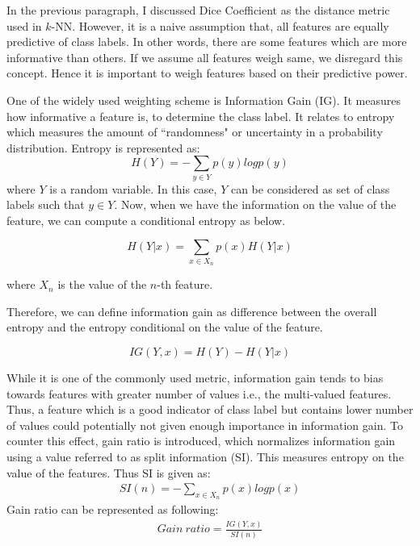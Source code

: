 In the previous paragraph, I discussed Dice Coefficient as the distance metric used in $k$-NN. However, it is a naive assumption that, all features are equally predictive of class labels. In other words, there are some features which are more informative than others. If we assume all features weigh same, we disregard this concept. Hence it is important to weigh features based on their predictive power. 

One of the widely used weighting scheme is Information Gain (IG). It measures how informative a feature is, to determine the class label. It relates to entropy which measures the amount of ``randomness" or uncertainty in a probability distribution. Entropy is represented as:
\begin{equation}
   H(Y) = -\sum_{y \in Y}  p(y)logp(y) 
\end{equation}
where $Y$ is a random variable. In this case, $Y$ can be considered as set of class labels such that $y \in Y$. 
Now, when we have the information on the value of the feature, we can compute a conditional entropy as below. 

\begin{equation}
    H(Y|x) = \sum_{x \in X_n} p(x)H(Y|x)
\end{equation}

where $X_n$ is the value of the $n$-th feature.


Therefore, we can define information gain as difference between the overall entropy and the entropy conditional on the value of the feature. 

\begin{equation}
    IG(Y,x) = H(Y) - H(Y|x)
\end{equation}

While it is one of the commonly used metric, information gain tends to bias towards features with greater number of values i.e., the multi-valued features. Thus, a feature which is a good indicator of class label but contains lower number of values could potentially not given enough importance in information gain. To counter this effect, gain ratio is introduced, which normalizes information gain using a value referred to as split information (SI). This measures entropy on the value of the features. Thus SI is given as:
\begin{align}
    SI(n) = - \sum_{x \in X_n} p(x)logp(x)
\end{align}
Gain ratio can be represented as following:
\begin{align}
    Gain\ ratio = \frac{IG(Y,x)}{SI(n)}
\end{align}


